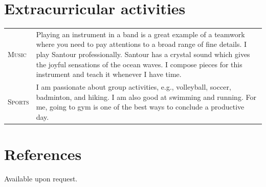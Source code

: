 \documentclass[10PT,letter]{article}
\newcommand{\numbox}[1]{} %
\begin{document}
\section*{\numbox{9}\bfseries\textcolor{titlecol}{\sffamily Extracurricular activities}}

	\begin{tabular}{p{1.2in}p{5.55in}}
		\textsc{Music} & Playing an instrument in a band is a great example of a teamwork where you need to pay attentions to a broad range of fine details.   I play Santour professionally. Santour has a crystal sound which gives the joyful sensations of  the ocean waves.  I compose pieces for this instrument and teach it whenever I have time. \\[.5mm]
		\textsc{Sports} & I am passionate about group activities, e.g., volleyball, soccer, badminton, and hiking. I am also good at swimming and running. For me, going to gym is one of the best ways to conclude a productive day. \\[.5mm]
	\end{tabular}
\section*{\numbox{9}\bfseries\textcolor{titlecol}{\sffamily References}}
Available upon request. 
\end{document}

